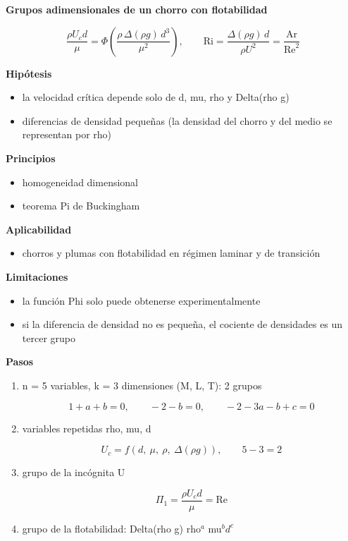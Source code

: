 \documentclass[10pt,openany]{book}
\begin{document}
\begin{tcolorbox}[title={Desarrollos del modelo}, studiumdef, breakable]
\noindent\textbf{Grupos adimensionales de un chorro con flotabilidad}

\begin{equation}
\frac{\rho U_c d}{\mu} = \Phi\!\left(\frac{\rho\,\Delta(\rho g)\,d^{3}}{\mu^{2}}\right),\qquad \mathrm{Ri} = \frac{\Delta(\rho g)\,d}{\rho U^{2}} = \frac{\mathrm{Ar}}{\mathrm{Re}^{2}}
\label{eq:c10-pi-flotabilidad}
\end{equation}

\noindent\textbf{Hipótesis}
\begin{itemize}
\item la velocidad crítica depende solo de d, mu, rho y Delta(rho g)
\item diferencias de densidad pequeñas (la densidad del chorro y del medio se representan por rho)
\end{itemize}

\noindent\textbf{Principios}
\begin{itemize}
\item homogeneidad dimensional
\item teorema Pi de Buckingham
\end{itemize}

\noindent\textbf{Aplicabilidad}
\begin{itemize}
\item chorros y plumas con flotabilidad en régimen laminar y de transición
\end{itemize}

\noindent\textbf{Limitaciones}
\begin{itemize}
\item la función Phi solo puede obtenerse experimentalmente
\item si la diferencia de densidad no es pequeña, el cociente de densidades es un tercer grupo
\end{itemize}

\noindent\textbf{Pasos}
\begin{enumerate}
\item
n = 5 variables, k = 3 dimensiones (M, L, T): 2 grupos

\[
1 + a + b = 0,\qquad -2 - b = 0,\qquad -2 - 3a - b + c = 0
\]
\item
variables repetidas rho, mu, d

\[
U_c = f\left(d,\ \mu,\ \rho,\ \Delta(\rho g)\right),\qquad 5 - 3 = 2
\]
\item
grupo de la incógnita U

\[
\Pi_1 = \frac{\rho U_c d}{\mu} = \mathrm{Re}
\]
\item
grupo de la flotabilidad: Delta(rho g) rho\(^a\) mu\(^b d^c\)


\end{enumerate}
\end{tcolorbox}
\end{document}
